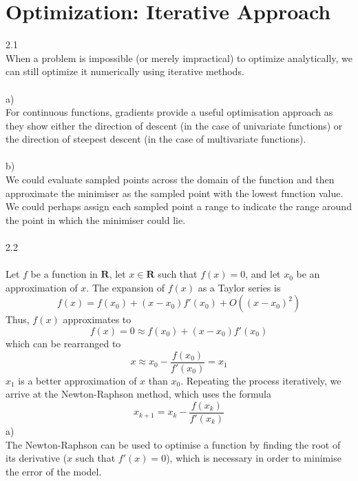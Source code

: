 \documentclass[10pt]{article}
\begin{document}
\section{Optimization: Iterative Approach}
2.1\\
When a problem is impossible (or merely impractical) to optimize analytically, we can still optimize it numerically using iterative methods.\\
\\
a)\\
For continuous functions, gradients provide a useful optimisation approach as they show either the direction of descent (in the case of univariate functions) or the direction of steepest descent (in the case of multivariate functions).\\
\\
b)\\
We could evaluate sampled points across the domain of the function and then approximate the minimiser as the sampled point with the lowest function value. We could perhaps assign each sampled point a range to indicate the range around the point in which the minimiser could lie.\\
\\
2.2\\
\\
Let $f$ be a function in $\mathbf{R}$, let $x \in \mathbf{R}$ such that $f(x)=0$, and let $x_{0}$ be an approximation of $x$. The expansion of $f(x)$ as a Taylor series is
\begin{equation}
f(x) = f(x_{0})+(x-x_{0})f'(x_{0})+O((x-x_{0})^2)
\end{equation}
Thus, $f(x)$ approximates to
\begin{equation}
f(x) = 0 \approx f(x_{0})+(x-x_{0})f'(x_{0})
\end{equation}
which can be rearranged to
\begin{equation}
x \approx x_{0} - \frac{f(x_{0})}{f'(x_{0})} = x_{1}
\end{equation}
$x_{1}$ is a better approximation of $x$ than $x_{0}$. Repeating the process iteratively, we arrive at the Newton-Raphson method, which uses the formula
\begin{equation}
x_{k+1} = x_{k} - \frac{f(x_{k})}{f'(x_{k})}
\end{equation}
\newpage
a)\\
The Newton-Raphson can be used to optimise a function by finding the root of its derivative ($x$ such that $f'(x)=0$), which is necessary in order to minimise the error of the model.\\
\end{document}
